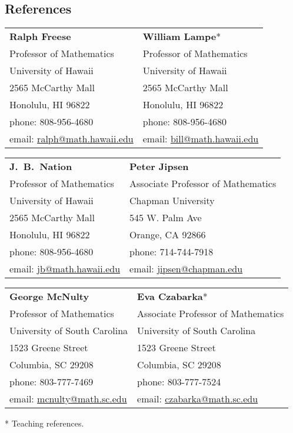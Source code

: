 \documentclass[margin,line]{resume}
\begin{document}
\begin{resume}
\section{\mysidestyle References} 

\begin{tabular}{@{}p{6cm}p{6cm}}
\textbf{Ralph Freese}       &  \textbf{William Lampe}*                  \\
Professor of Mathematics    &  Professor of Mathematics                      \\
University of Hawaii       &  University of Hawaii                      \\
2565 McCarthy Mall       &  2565 McCarthy Mall     \\
Honolulu, HI 96822     & Honolulu, HI 96822 \\
phone: 808-956-4680   &  phone: 808-956-4680 \\
email: \url{ralph@math.hawaii.edu} &  email: \url{bill@math.hawaii.edu}    \\
\end{tabular}

\begin{tabular}{@{}p{6cm}p{6cm}}
\textbf{J.~B.~Nation}            &  \textbf{Peter Jipsen}                    \\
Professor of Mathematics                            &  Associate Professor of Mathematics                      \\
University of Hawaii                    &  Chapman University\\
2565 McCarthy Mall       &  545 W. Palm Ave\\
Honolulu, HI 96822 & Orange, CA 92866 \\
phone: 808-956-4680   &  phone: 714-744-7918\\
email: \url{jb@math.hawaii.edu} &  email: \url{jipsen@chapman.edu}    \\
\end{tabular}

\begin{tabular}{@{}p{6cm}p{6cm}}
\textbf{George McNulty}           &  \textbf{Eva Czabarka}* \\
Professor of Mathematics     &  Associate Professor of Mathematics                      \\
University of South Carolina     &  University of South Carolina\\
1523 Greene Street              & 1523 Greene Street\\
Columbia, SC 29208              & Columbia, SC 29208 \\
phone: 803-777-7469             &  phone: 803-777-7524\\
email: \url{mcnulty@math.sc.edu} &  email: \url{czabarka@math.sc.edu}\\
\end{tabular}

* Teaching references.



\end{resume}
\end{document}
